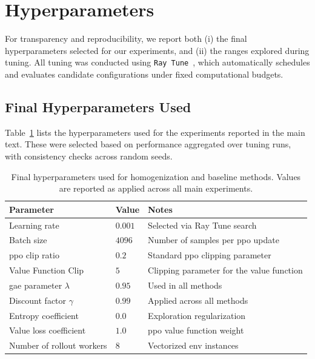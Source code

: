 \documentclass[]{jair}
\begin{document}

\section{Hyperparameters}
\label{con2:app:hyperparameters}

For transparency and reproducibility, we report both 
(i) the final hyperparameters selected for our experiments, and 
(ii) the ranges explored during tuning. 
All tuning was conducted using \texttt{Ray Tune}~\cite{liaw2018}, 
which automatically schedules and evaluates candidate configurations under 
fixed computational budgets.

\subsection{Final Hyperparameters Used}
Table~\ref{tab:final-hparams} lists the hyperparameters used for the 
experiments reported in the main text. These were selected based on performance 
aggregated over tuning runs, with consistency checks across random seeds.

\begin{table}[H]
    \centering
    \caption[Final Hyperparameters use for Implicit Indication Experiments]{
        Final hyperparameters used for homogenization and baseline methods. 
        Values are reported as applied across all main experiments.
    }
    \label{tab:final-hparams}
    \begin{tabular}{l l l}
        \toprule
        \textbf{Parameter} & \textbf{Value} & \textbf{Notes} \\
        \midrule
        Learning rate & \(0.001\) & Selected via Ray Tune search \\
        Batch size & \(4096\) & Number of samples per \gls{ppo} update \\
        \gls{ppo} clip ratio & \(0.2\) & Standard \gls{ppo} clipping parameter \\
        Value Function Clip & \(5\) & Clipping parameter for the value function \\
        \gls{gae} parameter $\lambda$ & \(0.95\) & Used in all methods \\
        Discount factor $\gamma$ & \(0.99\) & Applied across all methods \\
        Entropy coefficient & \(0.0\) & Exploration regularization \\
        Value loss coefficient & \(1.0\) & \gls{ppo} value function weight \\
        Number of rollout workers & \(8\) & Vectorized env instances \\
        \bottomrule
    \end{tabular}
\end{table}
\end{document}
